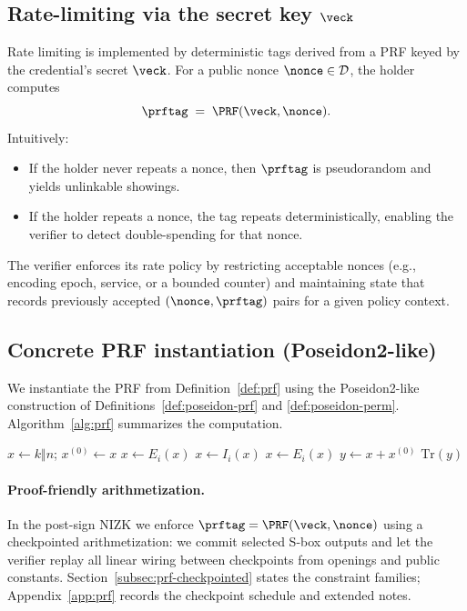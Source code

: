 \subsection{Rate-limiting via the secret key \(\veck\)}
Rate limiting is implemented by deterministic tags derived from a PRF keyed by the credential’s secret \(\veck\). For a
public nonce \(\nonce\in\mathcal{D}\), the holder computes
\[
  \prftag \;=\; \PRF(\veck,\nonce).
\]
Intuitively:
\begin{itemize}[leftmargin=1.25em]
  \item If the holder never repeats a nonce, then \(\prftag\) is pseudorandom and yields unlinkable showings.
  \item If the holder repeats a nonce, the tag repeats deterministically, enabling the verifier to detect
  double-spending for that nonce.
\end{itemize}
The verifier enforces its rate policy by restricting acceptable nonces (e.g., encoding epoch, service, or a bounded
counter) and maintaining state that records previously accepted \((\nonce,\prftag)\) pairs for a given
policy context.

\subsection{Concrete PRF instantiation (Poseidon2-like)}
\label{subsec:poseidon-prf}

\providecommand{\Tr}{\mathrm{Tr}}

We instantiate the PRF from Definition~\ref{def:prf} using the Poseidon2-like construction of
Definitions~\ref{def:poseidon-prf} and \ref{def:poseidon-perm}. Algorithm~\ref{alg:prf} summarizes the computation.

\begin{algorithm}[H]
\caption{$\PRF(k,n)$ (Poseidon2-like with feed-forward + truncation)}
\label{alg:prf}
\begin{algorithmic}[1]
\State $x \gets k\Vert n$; $x^{(0)}\gets x$
 \State $x\gets E_i(x)$ \EndFor
{} \State $x\gets I_i(x)$ \EndFor
{} \State $x\gets E_i(x)$ \EndFor
\State $y \gets x + x^{(0)}$ 
\State \Return $\Tr(y)$ 
\end{algorithmic}
\end{algorithm}

\paragraph{Proof-friendly arithmetization.}
In the post-sign NIZK we enforce $\prftag=\PRF(\veck,\nonce)$ using a checkpointed arithmetization: we commit
selected S-box outputs and let the verifier replay all linear wiring between checkpoints from openings and public
constants. Section~\ref{subsec:prf-checkpointed} states the constraint families; Appendix~\ref{app:prf} records the
checkpoint schedule and extended notes.

